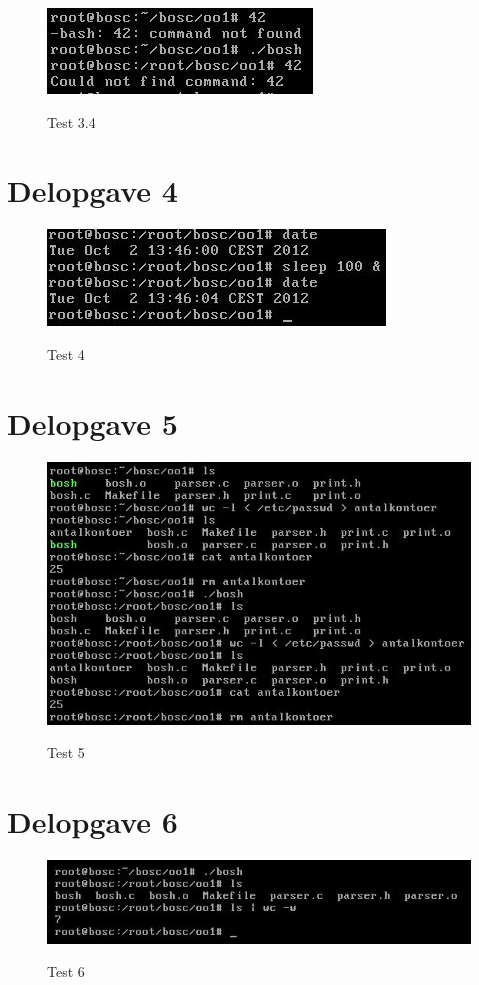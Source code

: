 \begin{figure}[!ht]
\centering
\caption{Test 3.4}
\includegraphics{Images/TestOfPart3_4}
\label{Test3_4}
\end{figure}


\section{Delopgave 4}
\begin{figure}[!h]
\centering
\caption{Test 4}
\includegraphics{Images/TestOfPart4}
\label{Test4}
\end{figure}

\clearpage
\section{Delopgave 5}
\begin{figure}[!h]
\centering
\caption{Test 5}
\includegraphics{Images/TestOfPart5}
\label{Test5}
\end{figure}

\section{Delopgave 6}
\begin{figure}[!h]
\centering
\caption{Test 6}
\includegraphics{Images/TestOfPart6}
\label{Test6}
\end{figure}


